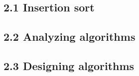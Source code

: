 
\subsection*{2.1 Insertion sort}


\subsection*{2.2 Analyzing algorithms}


\subsection*{2.3 Designing algorithms}

